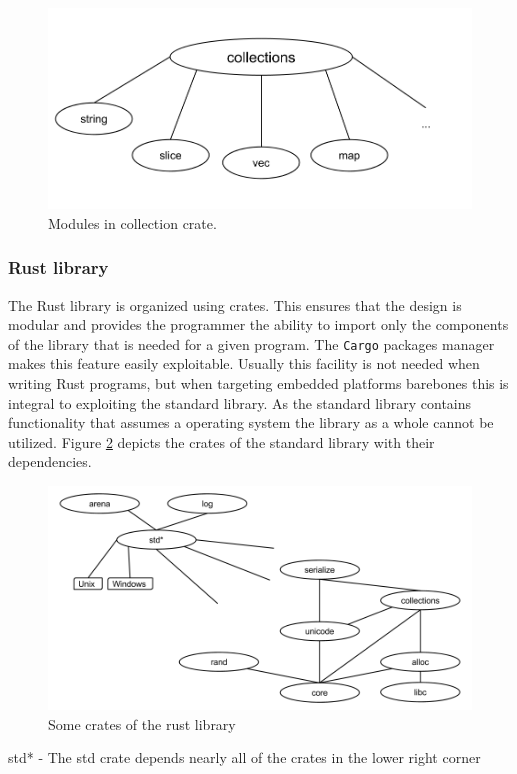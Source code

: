 \begin{figure}[H]
  \begin{center}
    \includegraphics[scale=0.3]{figures/background/rust/libcollections.png}
  \end{center}
  \caption{Modules in collection crate.}
  \label{fig:rust:collections}
\end{figure}

\subsubsection{Rust library}

The Rust library is organized using crates.
This ensures that the design is modular and provides the programmer the ability to import only the components of the library that is needed for a given program.
The \texttt{Cargo} packages manager makes this feature easily exploitable.
Usually this facility is not needed when writing Rust programs, but when targeting embedded platforms barebones  this is integral to exploiting the standard library.
As the standard library contains functionality that assumes a operating system the library as a whole cannot be utilized.
Figure \ref{fig:rust:librust} depicts the crates of the standard library with their dependencies.

\begin{figure}[H]
  \begin{center}
    \includegraphics[scale=0.3]{figures/background/rust/rust-lib.png}
  \end{center}
  \caption{Some crates of the rust library}
  \label{fig:rust:librust}
\end{figure}
std* - The std crate depends nearly all of the crates in the lower right corner

